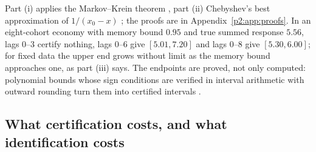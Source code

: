     Part (i) applies the Markov--Krein theorem \citep{p2:krein1977,p2:karlin1966}, part (ii) Chebyshev's best approximation of $1/(x_0-x)$ \citep{p2:achieser1956}; the proofs are in Appendix~\ref{p2:app:proofs}. In an eight-cohort economy with memory bound $0.95$ and true summed response $5.56$, lags $0$--$3$ certify nothing, lags $0$--$6$ give $[5.01,7.20]$ and lags $0$--$8$ give $[5.30,6.00]$; for fixed data the upper end grows without limit as the memory bound approaches one, as part (iii) says. The endpoints are proved, not only computed: polynomial bounds whose sign conditions are verified in interval arithmetic with outward rounding turn them into certified intervals \citep{p2:rump2010}.

    \subsection{What certification costs, and what identification costs}
